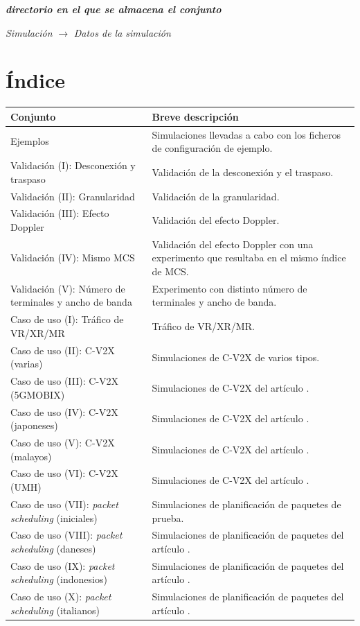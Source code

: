 \documentclass[12pt]{report} %
\begin{document}
\textbf{\textit{directorio en el que se almacena el conjunto}}

\textit{Simulación} $\rightarrow$ \textit{Datos de la simulación}

\section* {Índice}

\begin{tabular}{|P{5.0cm}|P{8.0cm}|}
\hline
\textbf{Conjunto} & \textbf{Breve descripción} \\
\hline
Ejemplos & Simulaciones llevadas a cabo con los ficheros de configuración de ejemplo. \\
\hline
Validación (I): Desconexión y traspaso & Validación de la desconexión y el traspaso. \\
\hline
Validación (II): Granularidad & Validación de la granularidad. \\
\hline
Validación (III): Efecto Doppler & Validación del efecto Doppler. \\
\hline
Validación (IV): Mismo MCS & Validación del efecto Doppler con una experimento que resultaba en el mismo índice de MCS. \\
\hline
Validación (V): Número de terminales y ancho de banda & Experimento con distinto número de terminales y ancho de banda. \\
\hline
Caso de uso (I): Tráfico de VR/XR/MR & Tráfico de VR/XR/MR. \\
\hline
Caso de uso (II): C-V2X (varias) & Simulaciones de C-V2X de varios tipos. \\
\hline
Caso de uso (III): C-V2X (5GMOBIX) & Simulaciones de C-V2X del artículo \cite{RefWorks:25}. \\
\hline
Caso de uso (IV): C-V2X (japoneses) & Simulaciones de C-V2X del artículo \cite{RefWorks:49}. \\
\hline
Caso de uso (V): C-V2X (malayos) & Simulaciones de C-V2X del artículo \cite{RefWorks:51}. \\
\hline
Caso de uso (VI): C-V2X (UMH) & Simulaciones de C-V2X del artículo \cite{RefWorks:48}. \\
\hline
Caso de uso (VII): \textit{packet scheduling} (iniciales) & Simulaciones de planificación de paquetes de prueba. \\
\hline
Caso de uso (VIII): \textit{packet scheduling} (daneses) & Simulaciones de planificación de paquetes del artículo \cite{RefWorks:66}. \\
\hline
Caso de uso (IX): \textit{packet scheduling} (indonesios) & Simulaciones de planificación de paquetes del artículo \cite{RefWorks:67}. \\
\hline
Caso de uso (X): \textit{packet scheduling} (italianos) & Simulaciones de planificación de paquetes del artículo \cite{RefWorks:26}. \\
\hline
\end{tabular}
\end{document}
